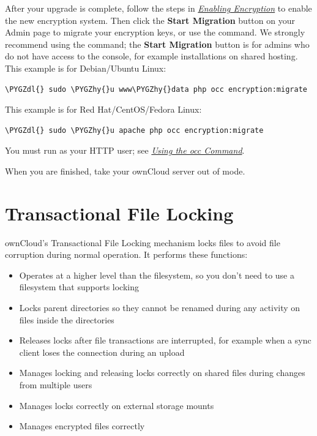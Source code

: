 \documentclass[letterpaper,10pt,english]{sphinxmanual}
\def\PYGZdl{\char`\$}
\def\PYGZhy{\char`\-}
\begin{document}
After your upgrade is complete, follow the steps in
{\hyperref[configuration_files/encryption_configuration:enable-encryption-label]{\emph{Enabling Encryption}}} to
enable the new encryption system. Then click the \textbf{Start Migration} button on
your Admin page to migrate your encryption keys, or use the  command. We
strongly recommend using the  command; the \textbf{Start Migration} button is
for admins who do not have access to the console, for example installations on
shared hosting. This example is for Debian/Ubuntu Linux:

\begin{Verbatim}[commandchars=\\\{\}]
\PYGZdl{} sudo \PYGZhy{}u www\PYGZhy{}data php occ encryption:migrate
\end{Verbatim}

This example is for Red Hat/CentOS/Fedora Linux:

\begin{Verbatim}[commandchars=\\\{\}]
\PYGZdl{} sudo \PYGZhy{}u apache php occ encryption:migrate
\end{Verbatim}

You must run  as your HTTP user; see
{\hyperref[configuration_server/occ_command::doc]{\emph{Using the occ Command}}}.

When you are finished, take your ownCloud server out of
 mode.


\section{Transactional File Locking}
\label{configuration_files/files_locking_transactional:transactional-file-locking}\label{configuration_files/files_locking_transactional::doc}
ownCloud's Transactional File Locking mechanism locks files to avoid
file corruption during normal operation. It performs these functions:
\begin{itemize}
\item {} 
Operates at a higher level than the filesystem, so you don't need to use a
filesystem that supports locking

\item {} 
Locks parent directories so they cannot be renamed during any activity on
files inside the directories

\item {} 
Releases locks after file transactions are interrupted, for
example when a sync client loses the connection during an upload

\item {} 
Manages locking and releasing locks correctly on shared files during changes
from multiple users

\item {} 
Manages locks correctly on external storage mounts

\item {} 
Manages encrypted files correctly

\end{itemize}
\end{document}
